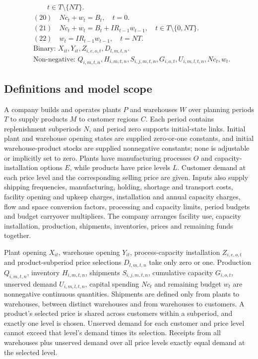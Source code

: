 \documentclass[10pt]{article}
\begin{document}
\[\begin{aligned}
& \qquad t \in T \setminus \{NT\}. \\
& (20) \quad Nc_t + w_t = B_t, \quad t = 0. \\
& (21) \quad Nc_t + w_t = B_t + IR_{t-1} w_{t-1}, \quad t \in T \setminus \{0, NT\}. \\
& (22) \quad w_t = IR_{t-1} w_{t-1}, \quad t = NT. \\
& \text{Binary: } X_{it}, Y_{it}, Z_{i,e,o,t}, D_{l,m,t,n}. \\
& \text{Non-negative: } Q_{i,m,t,n}, H_{i,m,t,n}, S_{i,j,m,t,n}, G_{i,o,t}, U_{i,m,l,t,n}, Nc_t, w_t.
\end{aligned}
\]

\subsection*{Definitions and model scope}
A company builds and operates plants $P$ and warehouses $W$ over planning periods $T$ to supply products $M$ to customer regions $C$. Each period contains replenishment subperiods $N$, and period zero supports initial-state links. Initial plant and warehouse opening states are supplied zero-or-one constants, and initial warehouse-product stocks are supplied nonnegative constants; none is adjustable or implicitly set to zero. Plants have manufacturing processes $O$ and capacity-installation options $E$, while products have price levels $L$. Customer demand at each price level and the corresponding selling price are given. Inputs also supply shipping frequencies, manufacturing, holding, shortage and transport costs, facility opening and upkeep charges, installation and annual capacity charges, flow and space conversion factors, processing and capacity limits, period budgets and budget carryover multipliers. The company arranges facility use, capacity installation, production, shipments, inventories, prices and remaining funds together.

Plant opening $X_{it}$, warehouse opening $Y_{it}$, process-capacity installation $Z_{i,e,o,t}$ and product-subperiod price selections $D_{l,m,t,n}$ take only zero or one. Production $Q_{i,m,t,n}$, inventory $H_{i,m,t,n}$, shipments $S_{i,j,m,t,n}$, cumulative capacity $G_{i,o,t}$, unserved demand $U_{i,m,l,t,n}$, capital spending $Nc_t$ and remaining budget $w_t$ are nonnegative continuous quantities. Shipments are defined only from plants to warehouses, between distinct warehouses and from warehouses to customers. A product's selected price is shared across customers within a subperiod, and exactly one level is chosen. Unserved demand for each customer and price level cannot exceed that level's demand times its selection. Receipts from all warehouses plus unserved demand over all price levels exactly equal demand at the selected level.
\end{document}
